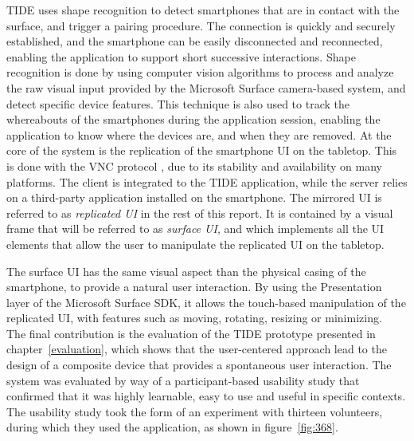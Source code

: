 TIDE uses shape recognition to detect smartphones that are in contact with the surface, and trigger a pairing procedure.
The connection is quickly and securely established, and the smartphone can be easily disconnected and reconnected, enabling the application to support short successive interactions.
Shape recognition is done by using computer vision algorithms to process and analyze the raw visual input provided by the Microsoft Surface camera-based system, and detect specific device features.
This technique is also used to track the whereabouts of the smartphones during the application session, enabling the application to know where the devices are, and when they are removed.
At the core of the system is the replication of the smartphone UI on the tabletop.
This is done with the VNC protocol \citep{Richardson:1998:vnc}, due to its stability and availability on many platforms.
The client is integrated to the TIDE application, while the server relies on a third-party application installed on the smartphone.
The mirrored UI is referred to as \emph{replicated UI} in the rest of this report.
It is contained by a visual frame that will be referred to as \emph{surface UI}, and which implements all the UI elements that allow the user to manipulate the replicated UI on the tabletop.
%

The surface UI has the same visual aspect than the physical casing of the smartphone, to provide a natural user interaction.
By using the Presentation layer of the Microsoft Surface SDK, it allows the touch-based manipulation of the replicated UI, with features such as moving, rotating, resizing or minimizing.
\\
\linebreak
The final contribution is the evaluation of the TIDE prototype presented in chapter~\ref{evaluation}, which shows that the user-centered approach lead to the design of a composite device that provides a spontaneous user interaction.
The system was evaluated by way of a participant-based usability study that confirmed that it was highly learnable, easy to use and useful in specific contexts.
The usability study took the form of an experiment with thirteen volunteers, during which they used the application, as shown in figure~\ref{fig:368}.

